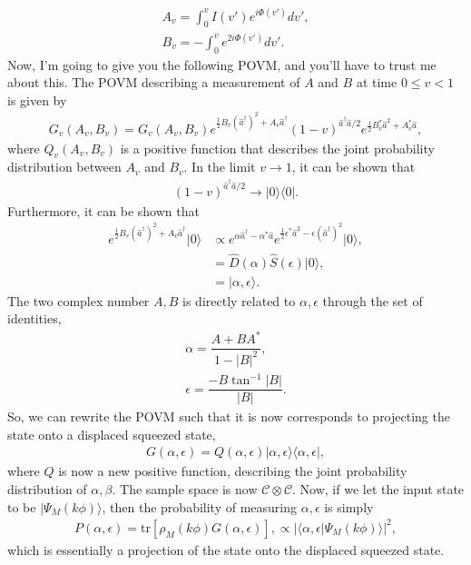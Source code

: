 \documentclass{article}
\begin{document}
\begin{align}
    A_v = \int_{0}^{v} I(v') e^{i\Phi(v')} dv',\\
    B_v = -\int_{0}^{v} e^{2i\Phi(v')} dv'.
\end{align}
Now, I'm going to give you the following POVM, and you'll have to trust me about this. The POVM describing a measurement of $A$ and $B$ at time $0\leq v <1$ is given by
\begin{align}
    G_v(A_v, B_v) = G_v(A_v, B_v)e^{\frac{1}{2}B_v(\hat{a}^\dagger)^2+A_v\hat{a}^\dagger}(1-v)^{\hat{a}^\dagger\hat{a}/2}e^{\frac{1}{2}B^*_v\hat{a}^2+A^*_v \hat{a}},
\end{align}
where $Q_v(A_v, B_v)$ is a positive function that describes the joint probability distribution between $A_v$ and $B_v$. In the limit $v\to 1$, it can be shown that 
\begin{align}
    (1-v)^{\hat{a}^\dagger\hat{a}/2}\to |0\rangle\langle 0|.
\end{align}
Furthermore, it can be shown that 
\begin{align}
    e^{\frac{1}{2}B_v(\hat{a}^\dagger)^2+A_v\hat{a}^\dagger}|0\rangle &\propto e^{\alpha\hat{a}^\dagger-\alpha^*\hat{a}}e^{\frac{1}{2}\epsilon^*\hat{a}^2-\epsilon(\hat{a}^\dagger)^2}|0\rangle,\\
    &=\hat{D}(\alpha)\hat{S}(\epsilon)|0\rangle,\\
    &=|\alpha,\epsilon\rangle.
\end{align}
The two complex number $A, B$ is directly related to $\alpha,\epsilon$ through the set of identities,
\begin{align}
    \alpha = \dfrac{A+BA^*}{1-|B|^2},\\
    \epsilon = \dfrac{-B\tan^{-1}|B|}{|B|}.
\end{align}
So, we can rewrite the POVM such that it is now corresponds to projecting the state onto a displaced squeezed state, 
\begin{align}
    G(\alpha, \epsilon) = Q(\alpha,\epsilon)|\alpha,\epsilon\rangle\langle \alpha,\epsilon|,
\end{align}
where $Q$ is now a new positive function, describing the joint probability distribution of $\alpha, \beta$. The sample space is now $\mathcal{C}\otimes\mathcal{C}$. Now, if we let the input state to be $|\Psi_M(k\phi)\rangle$, then the probability of measuring $\alpha,\epsilon$ is simply
\begin{align}
    P(\alpha,\epsilon) = \text{tr}\left[\rho_M(k\phi)G(\alpha,\epsilon)\right],
    \propto |\langle\alpha,\epsilon | \Psi_M(k\phi)\rangle|^2,
\end{align}
which is essentially a projection of the state onto the displaced squeezed state.
\end{document}

